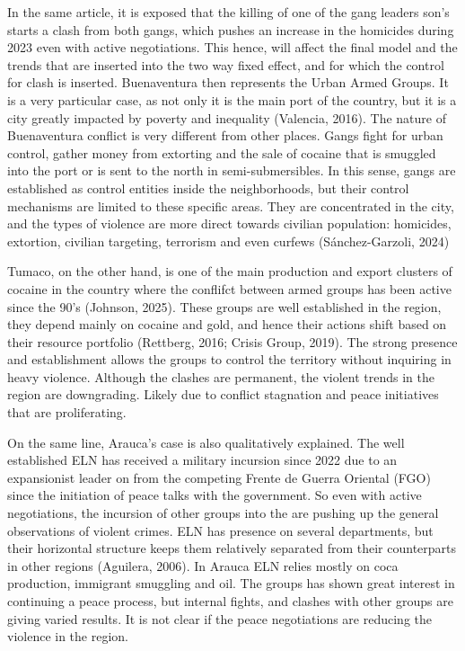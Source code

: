 \documentclass[11pt]{article}
\begin{document}
In the same article, it is exposed that the killing of one of the gang leaders son's starts a clash from both gangs, which pushes an increase in the homicides during 2023 even with active negotiations. This hence, will affect the final model and the trends that are inserted into the two way fixed effect, and for which the control for clash is inserted. Buenaventura then represents the Urban Armed Groups. It is a very particular case, as not only it is the main port of the country, but it is a city greatly impacted by poverty and inequality (Valencia, 2016). The nature of Buenaventura conflict is very different from other places. Gangs fight for urban control, gather money from extorting and the sale of cocaine that is smuggled into the port or is sent to the north in semi-submersibles. In this sense, gangs are established as control entities inside the neighborhoods, but their control mechanisms are limited to these specific areas. They are concentrated in the city, and the types of violence are more direct towards civilian population: homicides, extortion, civilian targeting, terrorism and even curfews (Sánchez-Garzoli, 2024)

Tumaco, on the other hand, is one of the main production and export clusters of cocaine in the country where the conflifct between armed groups has been active since the 90's (Johnson, 2025). These groups are well established in the region, they depend mainly on cocaine and gold, and hence their actions shift based on their resource portfolio (Rettberg, 2016; Crisis Group, 2019). The strong presence and establishment allows the groups to control the territory without inquiring in heavy violence. Although the clashes are permanent, the violent trends in the region are downgrading. Likely due to conflict stagnation and peace initiatives that are proliferating.

On the same line, Arauca's case is also qualitatively explained. The well established ELN has received a military incursion since 2022 due to an expansionist leader on from the competing Frente de Guerra Oriental (FGO) since the initiation of peace talks with the government. So even with active negotiations, the incursion of other groups into the are pushing up the general observations of violent crimes. ELN has presence on several departments, but their horizontal structure keeps them relatively separated from their counterparts in other regions (Aguilera, 2006). In Arauca ELN relies mostly on coca production, immigrant smuggling and oil. The groups has shown great interest in continuing a peace process, but internal fights, and clashes with other groups are giving varied results. It is not clear if the peace negotiations are reducing the violence in the region.
\end{document}
